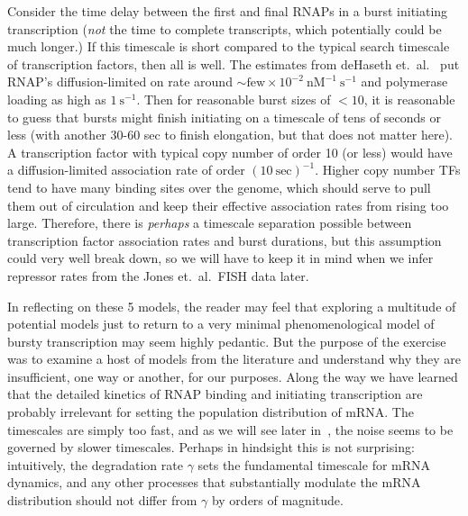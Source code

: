Consider the time delay between the first and final RNAPs in a burst initiating
transcription (\textit{not} the time to complete transcripts, which potentially
could be much longer.) If this timescale is short compared to the typical search
timescale of transcription factors, then all is well. The estimates from
deHaseth et.\ al.~\cite{DeHaseth1998} put RNAP's diffusion-limited on rate
around $\sim\text{few}\times10^{-2}~\text{nM}^{-1}~\text{s}^{-1}$ and polymerase
loading as high as $1~\text{s}^{-1}$. Then for reasonable burst sizes of $<10$,
it is reasonable to guess that bursts might finish initiating on a timescale of
tens of seconds or less (with another 30-60 sec to finish elongation, but that
does not matter here). A transcription factor with typical copy number of order
10 (or less) would have a diffusion-limited association rate of order
$(10~\text{sec})^{-1}$. Higher copy number TFs tend to have many binding sites
over the genome, which should serve to pull them out of circulation and keep
their effective association rates from rising too large. Therefore, there is
\textit{perhaps} a timescale separation possible between transcription factor
association rates and burst durations, but this assumption could very well break
down, so we will have to keep it in mind when we infer repressor rates from the
Jones et.\ al.\ FISH data later.

In reflecting on these 5 models, the reader may feel that exploring a multitude
of potential models just to return to a very minimal phenomenological model of
bursty transcription may seem highly pedantic. But the purpose of the exercise
was to examine a host of models from the literature and understand why they are
insufficient, one way or another, for our purposes. Along the way we have
learned that the detailed kinetics of RNAP binding and initiating transcription
are probably irrelevant for setting the population distribution of mRNA. The
timescales are simply too fast, and as we will see later
in~, the noise seems to be governed by slower timescales.
Perhaps in hindsight this is not surprising: intuitively, the degradation rate
$\gamma$ sets the fundamental timescale for mRNA dynamics, and any other
processes that substantially modulate the mRNA distribution should not differ
from $\gamma$ by orders of magnitude.